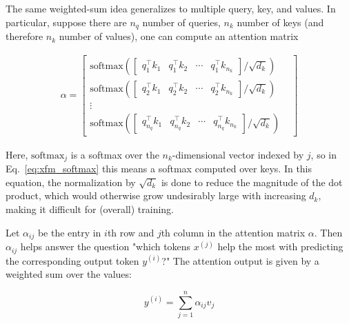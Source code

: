 The same weighted-sum idea generalizes to multiple query, key, and values. In particular, suppose there are $n_q$ number of queries, $n_k$ number of keys (and therefore $n_k$ number of values), one can compute an attention matrix

\begin{eqnarray}
\alpha = \begin{bmatrix}
    \text{softmax}\left( \begin{bmatrix}
                           q_1^\top k_1 & q_1^\top k_2 & \cdots & q_1^\top k_{n_k}
                         \end{bmatrix} / \sqrt{d_k} \right) \\
    \text{softmax}\left( \begin{bmatrix}
                           q_2^\top k_1 & q_2^\top k_2 & \cdots & q_2^\top k_{n_k}
                         \end{bmatrix} / \sqrt{d_k} \right) \\
    \vdots &                                                                     \\
    \text{softmax}\left( \begin{bmatrix}
                           q_{n_q}^\top k_1 & q_{n_q}^\top k_2 & \cdots & q_{n_q}^\top k_{n_k}
                         \end{bmatrix} / \sqrt{d_k} \right)
  \end{bmatrix}
\end{eqnarray}\label{eq:xfm_softmax}

Here, $\text{softmax}_j$ is a softmax over the $n_k$-dimensional vector indexed by $j$, so in Eq.~\ref{eq:xfm_softmax} this means a softmax computed over keys.  In this equation, the normalization by $\sqrt{d_k}$ is done to reduce the magnitude of the dot product, which would otherwise grow undesirably large with increasing $d_k,$ making it difficult for (overall) training.

Let $\alpha_{ij}$ be the entry in $i$th row and $j$th column in the attention matrix $\alpha$. Then $\alpha_{ij}$ helps answer the question "which tokens $x^{(j)}$ help the most with
predicting the corresponding output token $y^{(i)}$?" The attention output is given
by a weighted sum over the values:

$${y}^{(i)} = \sum_{j=1}^n  \alpha_{ij}
  v_{j}$$



